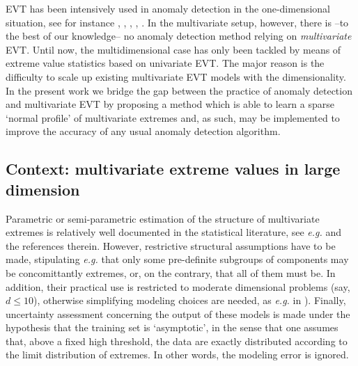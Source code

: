 EVT has been intensively used in anomaly detection in the one-dimensional
situation, see for instance \cite{Roberts99}, \cite{Roberts2000},
\cite{Clifton2011}, \cite{Clifton2008}, \cite{Lee2008}.
In the multivariate setup, however, there is --to the best of our
knowledge--  no anomaly detection method
relying on \textit{multivariate} EVT. Until now, the multidimensional case has only been  tackled by means of extreme value statistics
based on univariate EVT. The major reason is 
the difficulty to scale up existing multivariate EVT models
with the dimensionality. In the present work we bridge the gap between the practice of anomaly detection and multivariate EVT by proposing a method which is
able to learn a sparse `normal profile' of multivariate extremes and,
as such, may be implemented to improve the accuracy of any usual anomaly detection algorithm.

\subsection{Context: multivariate extreme values in large dimension}
\label{context}

Parametric or semi-parametric estimation of the structure of multivariate extremes is relatively well documented in the statistical literature, see  \emph{e.g.} \cite{coles1991modeling,fougeres2009models,cooley2010pairwise,sabourinNaveau2012} and the references therein. However, restrictive structural assumptions have to be made, stipulating \emph{e.g.} that only some pre-definite subgroups of components may be concomittantly extremes, or, on the contrary, that all of them must be. In addition, their practical use is restricted to moderate dimensional problems (say, $d\le 10$), otherwise simplifying modeling choices are needed, as \emph{e.g.} in \cite{stephenson2009high}). Finally, uncertainty assessment concerning the output of these models is made under the hypothesis that the training set is `asymptotic', in the sense that one assumes that, above a fixed high threshold, the data are exactly distributed according to the limit distribution of extremes. In other words, the modeling error is ignored. 

